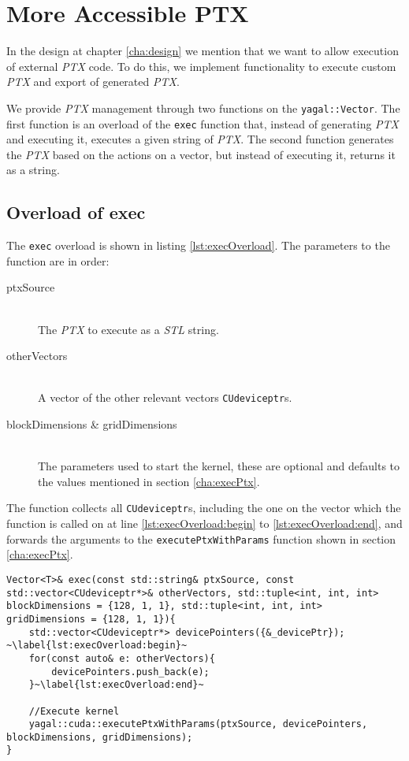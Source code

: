 \section{More Accessible PTX}
In the design at chapter \ref{cha:design} we mention that we want to allow execution of external \textit{PTX} code. To do this, we implement functionality to execute custom \textit{PTX} and export of generated \textit{PTX}.

We provide \textit{PTX} management through two functions on the \texttt{yagal::Vector}. The first function is an overload of the \texttt{exec} function that, instead of generating \textit{PTX} and executing it, executes a given string of \textit{PTX}. The second function generates the \textit{PTX} based on the actions on a vector, but instead of executing it, returns it as a string.

\subsection{Overload of exec}
The \texttt{exec} overload is shown in listing \ref{lst:execOverload}. The parameters to the function are in order:
\begin{description}
\item[ptxSource]\hfill\\The \textit{PTX} to execute as a \textit{STL} string.
\item[otherVectors]\hfill\\A vector of the other relevant vectors \texttt{CUdeviceptr}s.
\item[blockDimensions \& gridDimensions]\hfill\\The parameters used to start the kernel, these are optional and defaults to the values mentioned in section \ref{cha:execPtx}.
\end{description}

The function collects all \texttt{CUdeviceptr}s, including the one on the vector which the function is called on at line \ref{lst:execOverload:begin} to \ref{lst:execOverload:end}, and forwards the arguments to the \texttt{executePtxWithParams} function shown in section \ref{cha:execPtx}.

\begin{lstlisting}[caption={\texttt{exec} overload to just execute \textit{PTX}.}, label={lst:execOverload}]
Vector<T>& exec(const std::string& ptxSource, const std::vector<CUdeviceptr*>& otherVectors, std::tuple<int, int, int> blockDimensions = {128, 1, 1}, std::tuple<int, int, int> gridDimensions = {128, 1, 1}){
    std::vector<CUdeviceptr*> devicePointers({&_devicePtr}); ~\label{lst:execOverload:begin}~
    for(const auto& e: otherVectors){
        devicePointers.push_back(e);
    }~\label{lst:execOverload:end}~

    //Execute kernel
    yagal::cuda::executePtxWithParams(ptxSource, devicePointers, blockDimensions, gridDimensions);
}
\end{lstlisting}

